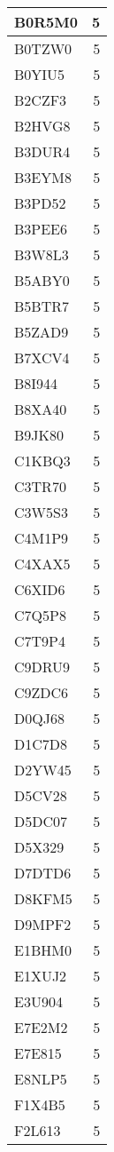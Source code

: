 \documentclass[
]{book}
\theoremstyle{definition}
\theoremstyle{definition}
\theoremstyle{definition}
\theoremstyle{definition}
\theoremstyle{remark}
\begin{document}
\begin{table}
\begin{tabular}{l|r}
B0R5M0 & 5\\
\hline
B0TZW0 & 5\\
\hline
B0YIU5 & 5\\
\hline
B2CZF3 & 5\\
\hline
B2HVG8 & 5\\
\hline
B3DUR4 & 5\\
\hline
B3EYM8 & 5\\
\hline
B3PD52 & 5\\
\hline
B3PEE6 & 5\\
\hline
B3W8L3 & 5\\
\hline
B5ABY0 & 5\\
\hline
B5BTR7 & 5\\
\hline
B5ZAD9 & 5\\
\hline
B7XCV4 & 5\\
\hline
B8I944 & 5\\
\hline
B8XA40 & 5\\
\hline
B9JK80 & 5\\
\hline
C1KBQ3 & 5\\
\hline
C3TR70 & 5\\
\hline
C3W5S3 & 5\\
\hline
C4M1P9 & 5\\
\hline
C4XAX5 & 5\\
\hline
C6XID6 & 5\\
\hline
C7Q5P8 & 5\\
\hline
C7T9P4 & 5\\
\hline
C9DRU9 & 5\\
\hline
C9ZDC6 & 5\\
\hline
D0QJ68 & 5\\
\hline
D1C7D8 & 5\\
\hline
D2YW45 & 5\\
\hline
D5CV28 & 5\\
\hline
D5DC07 & 5\\
\hline
D5X329 & 5\\
\hline
D7DTD6 & 5\\
\hline
D8KFM5 & 5\\
\hline
D9MPF2 & 5\\
\hline
E1BHM0 & 5\\
\hline
E1XUJ2 & 5\\
\hline
E3U904 & 5\\
\hline
E7E2M2 & 5\\
\hline
E7E815 & 5\\
\hline
E8NLP5 & 5\\
\hline
F1X4B5 & 5\\
\hline
F2L613 & 5\\

\end{tabular}
\end{table}
\end{document}
